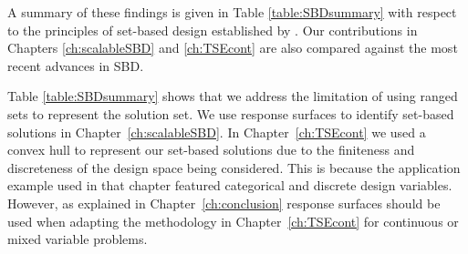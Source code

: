 A summary of these findings is given in Table \ref{table:SBDsummary} with respect to the principles of set-based design established by \citeauthor{SobekIi1999} \cite{SobekIi1999}. Our contributions in Chapters \ref{ch:scalableSBD} and \ref{ch:TSEcont} are also compared against the most recent advances in \ac{SBD}.

Table \ref{table:SBDsummary} shows that we address the limitation of using ranged sets to represent the solution set. We use response surfaces to identify set-based solutions in Chapter~\ref{ch:scalableSBD}. In Chapter~\ref{ch:TSEcont} we used a convex hull to represent our set-based solutions due to the finiteness and discreteness of the design space being considered. This is because the application example used in that chapter featured categorical and discrete design variables. However, as explained in Chapter~\ref{ch:conclusion} response surfaces should be used when adapting the methodology in Chapter~\ref{ch:TSEcont} for continuous or mixed variable problems.

\renewcommand{\changeCW}{0.55cm}
\renewcommand{\mycontCW}{1.2cm}

